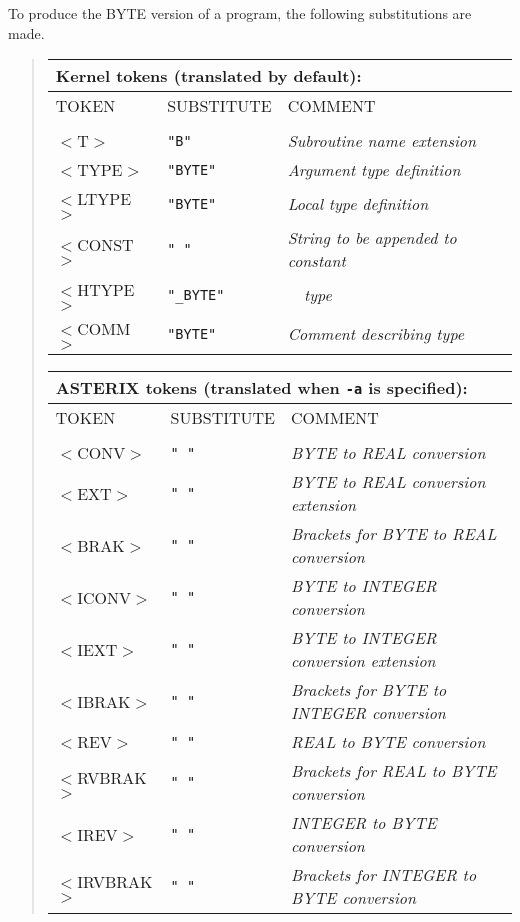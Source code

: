 \documentclass[twoside,11pt,nolof]{starlink}
\providecommand{\HDS}{{\footnotesize HDS}\normalsize}
\providecommand{\HDSref}{\xref{\HDS}{sun92}{}~}
\begin{document}
To produce the BYTE version of a program, the following substitutions
are made.
\begin{quote}
\begin{tabular}{lll}
\multicolumn{3}{l}{\bf{Kernel} tokens (translated by default):} \\
\hline
TOKEN  & SUBSTITUTE  & COMMENT \\
\\
$<$T$>$       & \texttt{"B"}       &\emph{Subroutine name extension} \\
$<$TYPE$>$    & \texttt{"BYTE"}    &\emph{Argument type definition} \\
$<$LTYPE$>$   & \texttt{"BYTE"}    &\emph{Local type definition} \\
$<$CONST$>$   & \texttt{" "}       &\emph{String to be appended to constant} \\
$<$HTYPE$>$   & \texttt{"\_BYTE"}  &\emph{\HDSref\ type} \\
$<$COMM$>$    & \texttt{"BYTE"}    &\emph{Comment describing type} \\
\end{tabular}

\begin{tabular}{lll}
\multicolumn{3}{l}{\bf{ASTERIX} tokens (translated when \texttt{-a} is specified):} \\
\hline
TOKEN  &SUBSTITUTE  & COMMENT \\
\\
$<$CONV$>$    & \texttt{" "} &\emph{BYTE to REAL conversion} \\
$<$EXT$>$     & \texttt{" "} &\emph{BYTE to REAL conversion extension} \\
$<$BRAK$>$    & \texttt{" "} &\emph{Brackets for BYTE to REAL conversion} \\
$<$ICONV$>$   & \texttt{" "} &\emph{BYTE to INTEGER conversion} \\
$<$IEXT$>$    & \texttt{" "} &\emph{BYTE to INTEGER conversion extension} \\
$<$IBRAK$>$   & \texttt{" "} &\emph{Brackets for BYTE to INTEGER conversion} \\
$<$REV$>$     & \texttt{" "} &\emph{REAL to BYTE conversion} \\
$<$RVBRAK$>$  & \texttt{" "} &\emph{Brackets for REAL to BYTE conversion} \\
$<$IREV$>$    & \texttt{" "} &\emph{INTEGER to BYTE conversion} \\
$<$IRVBRAK$>$ & \texttt{" "} &\emph{Brackets for INTEGER to BYTE conversion} \\
\end{tabular}
\end{quote}
\end{document}
